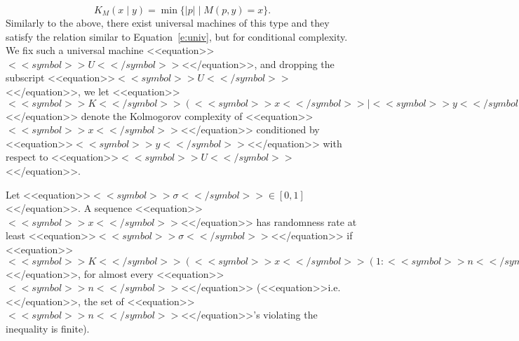 \documentclass[proceedings]{stacs}
\newcommand{\ie}{<<equation>>$\mbox{i.e.}$<</equation>>}
\begin{document}
\[K_M(x \mid y) = \min \{ |p| \mid M(p, y) = x \}.
\]
Similarly to the above, there exist  universal machines of this type and they satisfy the relation similar to Equation~\ref{e:univ}, but for conditional complexity. We fix such a universal machine <<equation>>$<<symbol>>U<</symbol>>$<</equation>>, and dropping the subscript <<equation>>$<<symbol>>U<</symbol>>$<</equation>>, we let <<equation>>$<<symbol>>K<</symbol>>(<<symbol>>x<</symbol>> \mid <<symbol>>y<</symbol>>)$<</equation>> denote the Kolmogorov complexity of <<equation>>$<<symbol>>x<</symbol>>$<</equation>> conditioned by <<equation>>$<<symbol>>y<</symbol>>$<</equation>> with respect to <<equation>>$<<symbol>>U<</symbol>>$<</equation>>. 



Let <<equation>>$<<symbol>>\sigma <</symbol>>\in [0,1]$<</equation>>. A sequence <<equation>>$<<symbol>>x<</symbol>>$<</equation>> has randomness rate at least <<equation>>$<<symbol>>\sigma<</symbol>>$<</equation>> if <<equation>>$<<symbol>>K<</symbol>>(<<symbol>>x<</symbol>>(1:<<symbol>>n<</symbol>>)) \geq <<symbol>>\sigma <</symbol>>\cdot <<symbol>>n<</symbol>>$<</equation>>, for almost every <<equation>>$<<symbol>>n<</symbol>>$<</equation>> (\ie, the set of <<equation>>$<<symbol>>n<</symbol>>$<</equation>>'s violating the inequality is finite).
\end{document}
